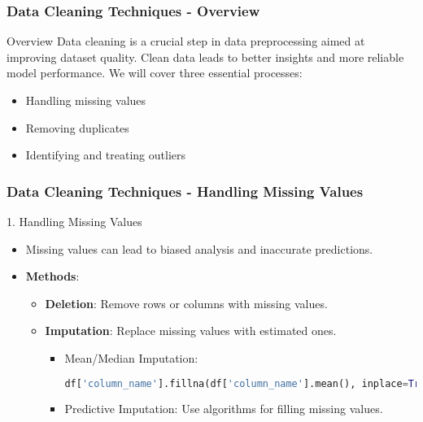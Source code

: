 \documentclass[aspectratio=169]{beamer}
\begin{document}
\begin{frame}[fragile]
    \frametitle{Data Cleaning Techniques - Overview}
    \begin{block}{Overview}
        Data cleaning is a crucial step in data preprocessing aimed at improving dataset quality. Clean data leads to better insights and more reliable model performance. 
        We will cover three essential processes:
        \begin{itemize}
            \item Handling missing values
            \item Removing duplicates
            \item Identifying and treating outliers
        \end{itemize}
    \end{block}
\end{frame}

\begin{frame}[fragile]
    \frametitle{Data Cleaning Techniques - Handling Missing Values}
    \begin{block}{1. Handling Missing Values}
        \begin{itemize}
            \item Missing values can lead to biased analysis and inaccurate predictions.
            \item \textbf{Methods}:
            \begin{itemize}
                \item \textbf{Deletion}: Remove rows or columns with missing values.
                \item \textbf{Imputation}: Replace missing values with estimated ones.
                \begin{itemize}
                    \item Mean/Median Imputation: 
                    \begin{lstlisting}[language=Python]
                    df['column_name'].fillna(df['column_name'].mean(), inplace=True)
                    \end{lstlisting}
                    \item Predictive Imputation: Use algorithms for filling missing values.
                \end{itemize}
            \end{itemize}
        \end{itemize}
    \end{block}
\end{frame}
\end{document}
